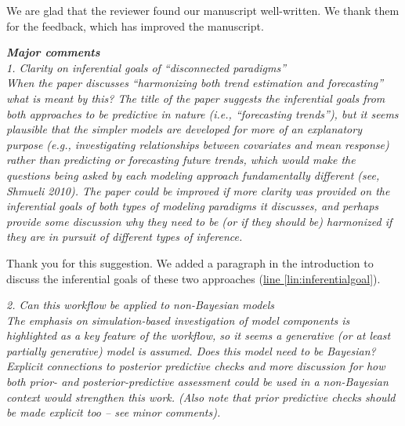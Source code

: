 \documentclass[11pt,letter]{article}
\begin{document}

We are glad that the reviewer found our manuscript well-written. 
We thank them for the feedback, which has improved the manuscript.

\begin{mybox}
\emph{\textbf{Major comments}\\
1. Clarity on inferential goals of “disconnected paradigms”\\
 When the paper discusses “harmonizing both trend estimation and forecasting” what is meant by this? The title of the paper suggests the inferential goals from both approaches to be predictive in nature (i.e., “forecasting trends”), but it seems plausible that the simpler models are developed for more of an explanatory purpose (e.g., investigating relationships between covariates and mean response) rather than predicting or forecasting future trends, which would make the questions being asked by each modeling approach fundamentally different (see, Shmueli 2010). The paper could be improved if more clarity was provided on the inferential goals of both types of modeling paradigms it discusses, and perhaps provide some discussion why they need to be (or if they should be) harmonized if they are in pursuit of different types of inference.}
\end{mybox}

Thank you for this suggestion. We added a paragraph in the introduction to discuss the inferential goals of these two approaches (\href{file:forecastflows_r1\#lintarget:inferentialgoal}{line \ref*{lin:inferentialgoal}}).

\begin{mybox}
\emph{2. Can this workflow be applied to non-Bayesian models\\
The emphasis on simulation-based investigation of model components is highlighted as a key feature of
the workflow, so it seems a generative (or at least partially generative) model is assumed. Does this model need to be Bayesian? Explicit connections to posterior predictive checks and more discussion for how both prior- and posterior-predictive assessment could be used in a non-Bayesian context would strengthen this work. (Also note that prior predictive checks should be made explicit too – see minor comments).}
\end{mybox}
\end{document}
